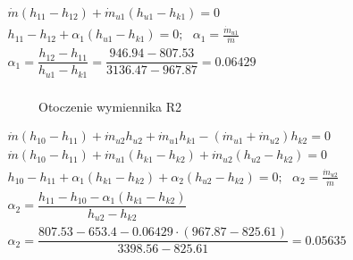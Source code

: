\begin{math}
	\begin{array}{l}
		\dot m ( h_{11} - h_{12} ) + \dot m_{u1} ( h_{u1} - h_{k1} ) = 0 \\
		h_{11} - h_{12} + \alpha_1 ( h_{u1} - h_{k1} ) = 0;
			~~~ \alpha_1 = \frac{\dot m_{u1}}{\dot m} \\
		\alpha_1 = \dfrac{h_{12} - h_{11}}{h_{u1} - h_{k1}}
			= \dfrac{\num{946,94} - \num{807,53}}{\num{3136,47} - \num{967,87}}
			= \num{0,06429} \\
	\end{array}
\end{math}

\begin{figure}[H]
	\centering

	\caption{Otoczenie wymiennika R2}
\end{figure}

\begin{math}
	\begin{array}{l}
		\dot m ( h_{10} - h_{11} ) + \dot m_{u2} h_{u2} + \dot m_{u1} h_{k1}
			- (\dot m_{u1} + \dot m_{u2}) h_{k2} = 0 \\
		\dot m ( h_{10} - h_{11} ) + \dot m_{u1} ( h_{k1} - h_{k2} )
			+ \dot m_{u2} ( h_{u2} - h_{k2} ) = 0 \\
		h_{10} - h_{11} + \alpha_1 ( h_{k1} - h_{k2} )
			+ \alpha_2 ( h_{u2} - h_{k2} ) = 0;
			~~~ \alpha_2 = \frac{\dot m_{u2}}{\dot m} \\

		\alpha_2 = \dfrac{h_{11} - h_{10} - \alpha_1 (h_{k1} - h_{k2})}{
				h_{u2} - h_{k2}} \\
		\alpha_2 = \dfrac{\num{807,53} - \num{653,4} - \num{0,06429} \cdot
				( \num{967,87} - \num{825,61} )}{\num{3398,56} - \num{825,61}}
				= \num{0,05635} \\
	\end{array}
\end{math}

